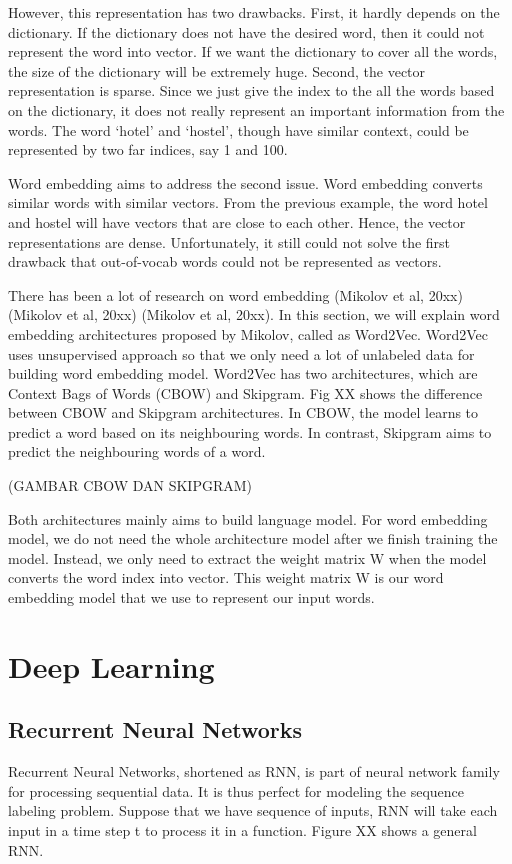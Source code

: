However, this representation has two drawbacks. First, it hardly depends on the dictionary. If the dictionary does not have the desired word, then it could not represent the word into vector. If we want the dictionary to cover all the words, the size of the dictionary will be extremely huge. Second, the vector representation is sparse. Since we just give the index to the all the words based on the dictionary, it does not really represent an important information from the words. The word ‘hotel’ and ‘hostel’, though have similar context, could be represented by two far indices, say 1 and 100. 

Word embedding aims to address the second issue. Word embedding converts similar words with similar vectors. From the previous example, the word hotel and hostel will have vectors that are close to each other. Hence, the vector representations are dense. Unfortunately, it still could not solve the first drawback that out-of-vocab words could not be represented as vectors.

There has been a lot of research on word embedding (Mikolov et al, 20xx) (Mikolov et al, 20xx) (Mikolov et al, 20xx). In this section, we will explain word embedding architectures proposed by Mikolov, called as Word2Vec. Word2Vec uses unsupervised approach so that we only need a lot of unlabeled data for building word embedding model. Word2Vec has two architectures, which are Context Bags of Words (CBOW) and Skipgram. Fig XX shows the difference between CBOW and Skipgram architectures. In CBOW, the model learns to predict a word based on its neighbouring words.	 In contrast, Skipgram aims to predict the neighbouring words of a word. 

(GAMBAR CBOW DAN SKIPGRAM)

Both architectures mainly aims to build language model. For word embedding model, we do not need the whole architecture model after we finish training the model. Instead, we only need to extract the weight matrix W when the model converts the word index into vector. This weight matrix W is our word embedding model that we use to represent our input words.

\section{Deep Learning}

\subsection{Recurrent Neural Networks}
Recurrent Neural Networks, shortened as RNN, is part of neural network family for processing sequential data. It is thus perfect for modeling the sequence labeling problem. Suppose that we have sequence of inputs, RNN will take each input in a time step t to process it in a function. Figure XX shows a general RNN.

